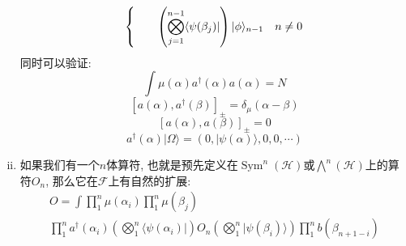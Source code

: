 \begin{enumerate}[(i)]
\begin{multline}
\begin{dcases}
            \quad\quad\left(\bigotimes_{j=1}^{n-1}\langle\psi(\beta_j)|\right)|\phi\rangle_{n-1}&n\neq0
        \end{dcases}
    \end{multline}
    同时可以验证:
    \begin{equation}
        \int\mu(\alpha)a^\dagger(\alpha)a(\alpha)=N
    \end{equation}
    \begin{equation}
        {[a(\alpha), a^\dagger(\beta)]}_\pm=\delta_\mu(\alpha-\beta)
    \end{equation}
    \begin{equation}
        {[a(\alpha), a(\beta)]}_\pm=0
    \end{equation}
    \begin{equation}
        a^\dagger(\alpha)|\Omega\rangle=(0,|\psi(\alpha)\rangle,0,0,\cdots)
    \end{equation}
    \item 如果我们有一个$n$体算符, 也就是预先定义在$\operatorname{Sym}^n(\mathcal{H})$或$\operatorname{\bigwedge}^n(\mathcal{H})$上的算符$O_n$, 那么它在$\mathcal{F}$上有自然的扩展:
    \begin{multline}
        O=\int\prod_1^n\mu(\alpha_i)\prod_1^n\mu(\beta_j)\\
        \prod_1^na^\dagger(\alpha_i)\left(\bigotimes_1^n\langle\psi(\alpha_i)|\right)O_n\left(\bigotimes_1^n|\psi(\beta_i)\rangle\right)\prod_1^nb(\beta_{n+1-i})
    \end{multline}
\end{enumerate}
